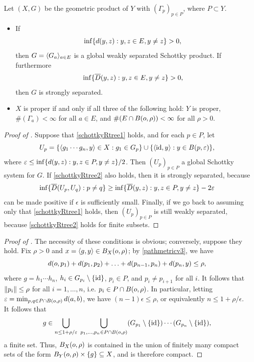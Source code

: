 \begin{proposition}
\label{propositionschottkyRtree}
Let $(X,G)$ be the geometric product of $Y$ with $(\Gamma_p)_{p\in P}$, where $P\subset Y$.
\begin{itemize}
\item[(i)] If
\begin{equation}
\label{schottkyRtree1}
\inf\{d(y,z) : y,z\in E, y\neq z \} > 0,
\end{equation}
then $G = \langle G_a\rangle_{a\in E}$ is a global weakly separated Schottky product. If furthermore
\begin{equation}
\label{schottkyRtree2}
\inf\{\overline{D}(y,z) : y,z\in E, y\neq z \} > 0,
\end{equation}
then $G$ is strongly separated.
\item[(ii)] $X$ is proper if and only if all three of the following hold: $Y$ is proper, $\#(\Gamma_a) < \infty$ for all $a\in E$, and $\#(E\cap B(o,\rho)) < \infty$ for all $\rho > 0$.
\end{itemize}
\end{proposition}

\begin{proof}[Proof of ]
Suppose that \eqref{schottkyRtree1} holds, and for each $p\in P$, let
\[
U_p = \{\langle g_1\cdots g_n,y\rangle \in X : g_1\in G_p\} \cup \{\langle \mathrm{id},y\rangle : y\in B(p,\varepsilon)\},
\]
where $\varepsilon \leq \inf\{d(y,z) : y,z\in P, y\neq z\}/2$. Then $(U_p)_{p\in P}$ a global Schottky system for $G$. If \eqref{schottkyRtree2} also holds, then it is strongly separated, because 
\[
\inf\{\overline{D}(U_p,U_q) : p\neq q\} \geq \inf\{\overline{D}(y,z) : y,z\in P, y\neq z\} - 2\varepsilon
\] 
can be made positive if $\epsilon$ is sufficiently small. Finally, if we go back to assuming only that \eqref{schottkyRtree1} holds, then $(U_p)_{p\in P}$ is still weakly separated, because \eqref{schottkyRtree2} holds for finite subsets.
\end{proof}

\begin{proof}[Proof of ]
The necessity of these conditions is obvious; conversely, suppose they hold. Fix $\rho > 0$ and $x = \langle g,y\rangle\in B_X(o,\rho)$; by \eqref{pathmetricv3}, we have
\[
d(o,p_1) + d(p_1,p_2) + \ldots + d(p_{n - 1},p_n) + d(p_n,y) \leq \rho,
\]
where $g = h_1\cdots h_n$, $h_i\in G_{p_i}\setminus\{\mathrm{id}\}$, $p_i\in P$, and $p_i\neq p_{i + 1}$ for all $i$. It follows that $\|p_i\| \leq \rho$ for all $i = 1,\ldots,n$, i.e. $p_i\in P\cap B(o,\rho)$. In particular, letting $\varepsilon = \min_{p,q\in P\cap B(o,\rho)} d(a,b)$, we have $(n - 1)\epsilon\leq \rho$, or equivalently $n\leq 1 + \rho/\epsilon$. It follows that
\[
g\in\bigcup_{n\leq 1 + \rho/\varepsilon} \; \bigcup_{p_1,\ldots,p_n\in P\cap B(o,\rho)} (G_{p_1}\setminus\{\mathrm{id}\})\cdots (G_{p_n}\setminus\{\mathrm{id}\}),
\]
a finite set. Thus, $B_X(o,\rho)$ is contained in the union of finitely many compact sets of the form $B_Y(o,\rho)\times\{g\}\subseteq X$, and is therefore compact.
\end{proof}

\endinput